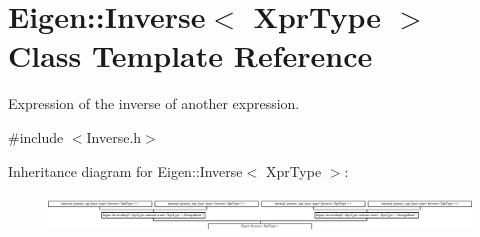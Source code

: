 \hypertarget{class_eigen_1_1_inverse}{}\section{Eigen\+:\+:Inverse$<$ Xpr\+Type $>$ Class Template Reference}
\label{class_eigen_1_1_inverse}


Expression of the inverse of another expression.  




{\ttfamily \#include $<$Inverse.\+h$>$}

Inheritance diagram for Eigen\+:\+:Inverse$<$ Xpr\+Type $>$\+:\begin{figure}[H]
\begin{center}
\leavevmode
\includegraphics[height=0.983607cm]{class_eigen_1_1_inverse}
\end{center}
\end{figure}
